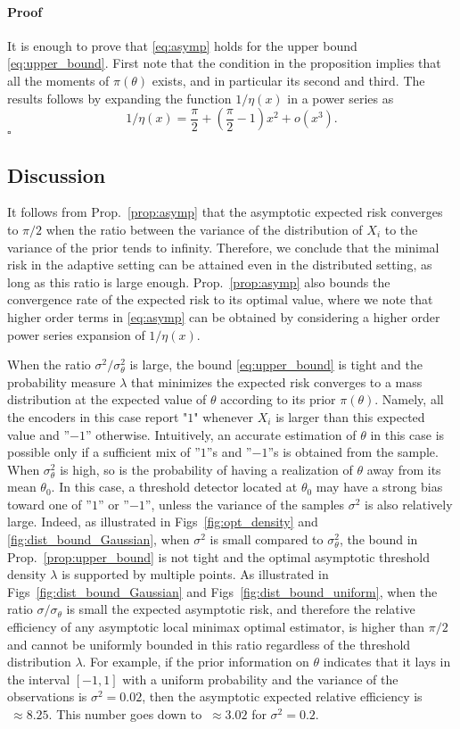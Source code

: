 \documentclass[letterpaper, conference]{IEEEtran}      %
\newenvironment{proof}{\paragraph*{Proof}}{\hfill$\square$ \newline}
\begin{document}
\begin{proof}
It is enough to prove that  \eqref{eq:asymp} holds for the upper bound \eqref{eq:upper_bound}. First note that the condition in the proposition implies that all the moments of $\pi(\theta)$ exists, and in particular its second and third. The results follows by expanding the function $1/\eta(x)$ in a power series as
\[
1/\eta(x) = \frac{\pi}{2} + \left(\frac{\pi}{2}-1 \right) x^2 + o(x^3).
\]
\end{proof}


\subsection{Discussion}
It follows from Prop.~\ref{prop:asymp} that the asymptotic expected risk converges to $\pi/2$ when the ratio between the variance of the distribution of $X_i$ to the variance of the prior tends to infinity. Therefore, we conclude that the minimal risk in the adaptive setting can be attained even in the distributed setting, as long as this ratio is large enough. Prop.~\ref{prop:asymp} also bounds the convergence rate of the expected risk to its optimal value, where we note that higher order terms in \eqref{eq:asymp} can be obtained by considering a higher order power series expansion of $1/\eta(x)$. \par
When the ratio $\sigma^2/ \sigma_\theta^2$ is large, the bound \eqref{eq:upper_bound} is tight and the probability measure $\lambda$ that minimizes the expected risk converges to a mass distribution at the expected value of $\theta$ according to its prior $\pi(\theta)$. Namely, all the encoders in this case report "$1$" whenever $X_i$ is larger than this expected value and ''$-1$'' otherwise. Intuitively, an accurate estimation of $\theta$ in this case is possible only if a sufficient mix of ''$1$''s and ''$-1$''s is obtained from the sample. When $\sigma_\theta^2$ is high, so is the probability of having a realization of $\theta$ away from its mean $\theta_0$. In this case, a threshold detector located at $\theta_0$ may have a strong bias toward one of ''$1$'' or ''$-1$'', unless the variance of the samples $\sigma^2$ is also relatively large. Indeed, as illustrated in Figs~\ref{fig:opt_density} and \ref{fig:dist_bound_Gaussian}, when $\sigma^2$ is small compared to $\sigma_\theta^2$, the bound in Prop.~\ref{prop:upper_bound} is not tight and the optimal asymptotic threshold density $\lambda$ is supported by multiple points. As illustrated in Figs~\ref{fig:dist_bound_Gaussian} and Figs~\ref{fig:dist_bound_uniform}, when the ratio $\sigma/\sigma_\theta$ is small the expected asymptotic risk, and therefore the relative efficiency of any asymptotic local minimax optimal estimator, is higher than $\pi/2$ and cannot be uniformly bounded in this ratio regardless of the threshold distribution $\lambda$. For example, if the prior information on $\theta$ indicates that it lays in the interval $[-1,1]$ with a uniform probability and the variance of the observations is $\sigma^2 = 0.02$, then the asymptotic expected relative efficiency is $~\approx 8.25$. This number goes down to $~\approx 3.02$ for $\sigma^2 = 0.2$. 
\\
\end{document}
